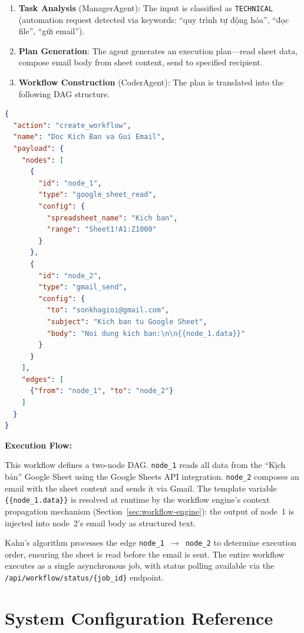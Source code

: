 \documentclass[11pt,a4paper]{report}
\begin{document}
\begin{enumerate}
  \item \textbf{Task Analysis} (ManagerAgent): The input is classified as \texttt{TECHNICAL} (automation request detected via keywords: ``quy trình tự động hóa'', ``đọc file'', ``gửi email'').
  \item \textbf{Plan Generation}: The agent generates an execution plan---read sheet data, compose email body from sheet content, send to specified recipient.
  \item \textbf{Workflow Construction} (CoderAgent): The plan is translated into the following DAG structure.
\end{enumerate}

\begin{lstlisting}[language=json, caption={AI Agent output: automated Google Sheet to Email workflow.}, label={lst:agent-json}]
{
  "action": "create_workflow",
  "name": "Doc Kich Ban va Gui Email",
  "payload": {
    "nodes": [
      {
        "id": "node_1",
        "type": "google_sheet_read",
        "config": {
          "spreadsheet_name": "Kich ban",
          "range": "Sheet1!A1:Z1000"
        }
      },
      {
        "id": "node_2",
        "type": "gmail_send",
        "config": {
          "to": "sonkhagioi@gmail.com",
          "subject": "Kich ban tu Google Sheet",
          "body": "Noi dung kich ban:\n\n{{node_1.data}}"
        }
      }
    ],
    "edges": [
      {"from": "node_1", "to": "node_2"}
    ]
  }
}
\end{lstlisting}

\noindent\textbf{Execution Flow:}

This workflow defines a two-node DAG. \texttt{node\_1} reads all data from the ``Kịch bản'' Google Sheet using the Google Sheets API integration. \texttt{node\_2} composes an email with the sheet content and sends it via Gmail. The template variable \texttt{\{\{node\_1.data\}\}} is resolved at runtime by the workflow engine's context propagation mechanism (Section~\ref{sec:workflow-engine}): the output of node~1 is injected into node~2's email body as structured text.

Kahn's algorithm processes the edge \texttt{node\_1 $\to$ node\_2} to determine execution order, ensuring the sheet is read before the email is sent. The entire workflow executes as a single asynchronous job, with status polling available via the \texttt{/api/workflow/status/\{job\_id\}} endpoint.

\chapter{System Configuration Reference}
\label{app:config}
\end{document}
